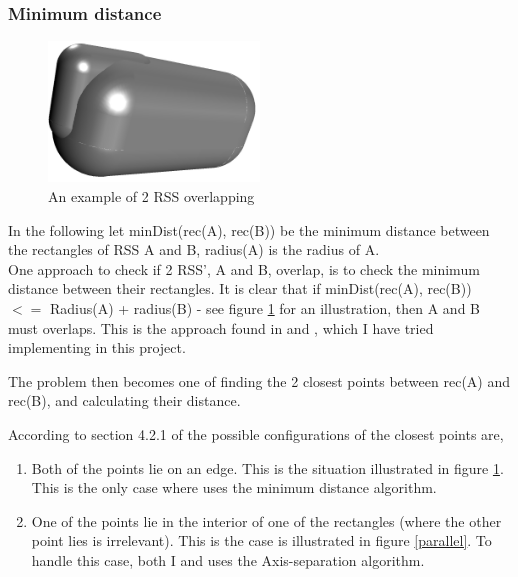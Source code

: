 \subsubsection{Minimum distance}

\begin{figure}
\centering
\includegraphics[width=0.5\textwidth]{figures/normalInter}
\caption{\label{normal-inter}An example of 2 RSS overlapping}
\end{figure}

In the following let minDist(rec(A), rec(B)) be the minimum distance between the rectangles of RSS A and B, radius(A) is the radius of A.\\

One approach to check if 2 RSS', A and B, overlap, is to check the minimum distance between their rectangles. It is clear that if minDist(rec(A), rec(B)) $<=$ Radius(A) + radius(B) - see figure \ref{normal-inter} for an illustration, then A and B must overlaps. This is the approach found in \cite{Larsen99fastproximity} and \cite{larsen00fast}, which I have tried implementing in this project.

The problem then becomes one of finding the 2 closest points between rec(A) and rec(B), and calculating their distance.

According to section 4.2.1 of \cite{Larsen99fastproximity} the possible configurations of the closest points are, 
\begin{enumerate}
\item Both of the points lie on an edge. This is the situation illustrated in figure \ref{normal-inter}. This is the only case where \cite{Larsen99fastproximity} uses the minimum distance algorithm.
\item One of the points lie in the interior of one of the rectangles (where the other point lies is irrelevant). This is the case is illustrated in figure \ref{parallel}. To handle this case, both I and \cite{Larsen99fastproximity} uses the Axis-separation algorithm. 
\end{enumerate}


